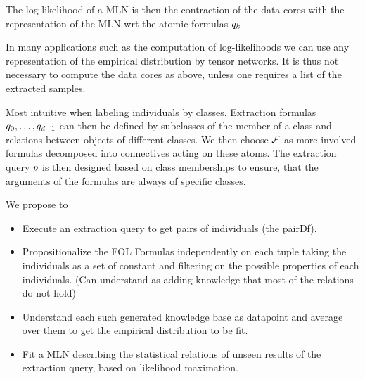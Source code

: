 The log-likelihood of a MLN is then the contraction of the data cores with the representation of the MLN wrt the atomic formulas $q_{k}$.












% 
\begin{remark}
	In many applications such as the computation of log-likelihoods we can use any representation of the empirical distribution by tensor networks. 
	It is thus not necessary to compute the data cores as above, unless one requires a list of the extracted samples.
\end{remark}






Most intuitive when labeling individuals by classes.
Extraction formulas $q_{0},\ldots,q_{d-1}$ can then be defined by subclasses of the member of a class and relations between objects of different classes. %
We then choose $\mathcal{F}$ as more involved formulas decomposed into connectives acting on these atoms.
The extraction query $p$ is then designed based on class memberships to ensure, that the arguments of the formulas are always of specific classes. %

We propose to
\begin{itemize}
	\item Execute an extraction query to get pairs of individuals (the pairDf).
	\item Propositionalize the FOL Formulas independently on each tuple taking the individuals as a set of constant and filtering on the possible properties of each individuals.
		(Can understand as adding knowledge that most of the relations do not hold)
	\item Understand each such generated knowledge base as datapoint and average over them to get the empirical distribution to be fit. 
	\item Fit a MLN describing the statistical relations of unseen results of the extraction query, based on likelihood maximation.
\end{itemize}



